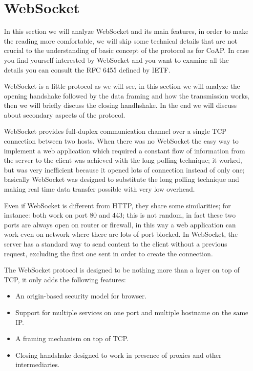 \section{WebSocket}
In this section we will analyze WebSocket and its main features, in order to make the reading more comfortable,
we will skip some technical details that are not crucial to the understanding of basic concept of the protocol as for CoAP.\newline
In case you find yourself interested by WebSocket and you want to examine all the details you can consult the RFC 6455 defined by IETF. \newline

WebSocket is a little protocol as we will see, in this section we will analyze the opening handshake followed by the data framing and how the transmission works, then we will briefly discuss the closing handhshake.\newline
In the end we will discuss about secondary aspects of the protocol.\newline

WebSocket provides full-duplex communication channel over a single TCP connection between two hosts.\newline
When there was no WebSocket the easy way to implement a web application which required a constant flow of information from
the server to the client was achieved with the long polling technique; it worked, but was very inefficient because it opened
lots of connection instead of only one; basically WebSocket was designed to substitute the long polling technique and making real time data transfer 
possible with very low overhead.\newline

Even if WebSocket is different from HTTP, they share some similarities; for instance: both work on port 80 and 443; this is not random, in fact these two ports
are always open on router or firewall, in this way a web application can work even on network where there are lots of port blocked.\newline
In WebSocket, the server has a standard way to send content to the client without a previous request, excluding the first one sent in order to create the connection.\newline

The WebSocket protocol is designed to be nothing more than a layer on top of TCP, it only adds the following features:
\begin{itemize}
	\item An origin-based security model for browser.
	\item Support for multiple services on one port and multiple hostname on the same IP.
	\item A framing mechanism on top of TCP.
	\item Closing handshake designed to work in presence of proxies and other intermediaries.
\end{itemize}

